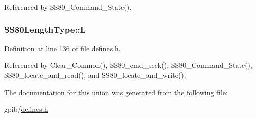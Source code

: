 Referenced by S\+S80\+\_\+\+Command\+\_\+\+State().

\subsubsection[{\texorpdfstring{L}{L}}]{ S\+S80\+Length\+Type\+::L}\hypertarget{unionSS80LengthType_a8939afbd3197ba892aa2b15782086a71}{}\label{unionSS80LengthType_a8939afbd3197ba892aa2b15782086a71}


Definition at line 136 of file defines.\+h.



Referenced by Clear\+\_\+\+Common(), S\+S80\+\_\+cmd\+\_\+seek(), S\+S80\+\_\+\+Command\+\_\+\+State(), S\+S80\+\_\+locate\+\_\+and\+\_\+read(), and S\+S80\+\_\+locate\+\_\+and\+\_\+write().



The documentation for this union was generated from the following file\+:\begin{DoxyCompactItemize}
\item 
gpib/\hyperlink{defines_8h}{defines.\+h}\end{DoxyCompactItemize}
